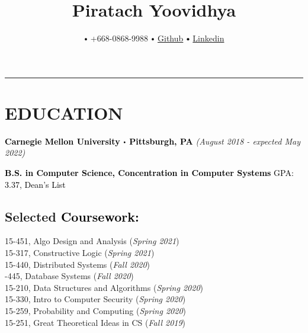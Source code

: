 \documentclass[10pt]{article}
\title{\bfseries\Huge Piratach Yoovidhya}
\author{
  \small \myemail
   $\sbullet[.75]$
   +668-0868-9988
   $\sbullet[.75]$
  \href{https://github.com/Piratach}{Github}
   $\sbullet[.75]$
  \href{https://www.linkedin.com/in/piratach-yoovidhya/}
{Linkedin}
}
\date{}
\newcommand\sbullet[1][.5]{\mathbin{\vcenter{\hbox{\scalebox{#1}{$\bullet$}}}}}
\begin{document}
  \maketitle
  \thispagestyle{empty}
  \vspace*{-1.0cm}
  \hrule
  \vspace*{-0.15cm}

  \section*{\large \textcolor{lighterB}{EDUCATION}}
  \vspace*{-0.3cm}
  \textbf{\large \textcolor{Black}{Carnegie Mellon University $\sbullet$ Pittsburgh, PA}} \hfill \textit{(August 2018 - expected May 2022)}

  \vspace{0.05cm}

  \textcolor{Black}{\textbf{B.S. in Computer Science, Concentration in Computer Systems} \hfill GPA: 3.37, Dean's List}

  \vspace{0.2cm}

  \vspace*{-0.5cm}

  \subsection*{Selected \textcolor{Black}{Coursework:}}

    \vspace*{-0.55cm}
    \begin{multicols}{2}
       15-451, Algo Design and Analysis (\textit{Spring 2021}) \\
       15-317, Constructive Logic (\textit{Spring 2021}) \\
       15-440, Distributed Systems (\textit{Fall 2020}) \\
       -445, Database Systems (\textit{Fall 2020}) \\
       15-210, Data Structures and Algorithms (\textit{Spring 2020}) \\
       15-330, Intro to Computer Security (\textit{Spring 2020}) \\
       15-259, Probability and Computing (\textit{Spring 2020}) \\
       15-251, Great Theoretical Ideas in CS (\textit{Fall 2019})
    \end{multicols}
\end{document}
